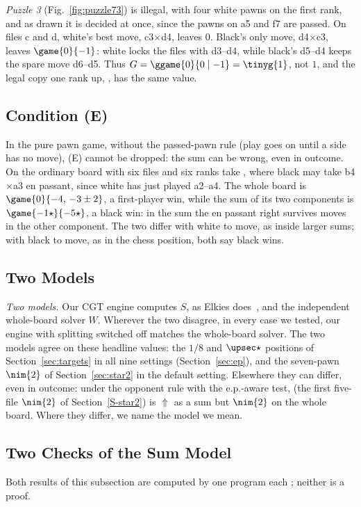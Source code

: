 \emph{Puzzle 3} (Fig.~\ref{fig:puzzle73}) is illegal, with four white pawns on the first rank, and as drawn it
is decided at once, since the pawns on a5 and f7 are passed. On files c and d, white's best move, c3$\times$d4,
leaves $0$. Black's only move, d4$\times$c3, leaves $\game{0}{-1}$: white locks the files with d3--d4, while
black's d5--d4 keeps the spare move d6--d5. Thus $G=\ggame{0}{0\mid -1}=\tinyg{1}$, not $1$, and the legal copy
one rank up, , has the same value.

\subsection{Condition (E)}
\begin{proposition}[\lab{C1}]\label{prop:condE}
In the pure pawn game, without the passed-pawn rule (play goes on until a side has no move), (E) cannot
be dropped: the sum can be wrong, even in outcome. On the ordinary board with six files and six ranks take
, where black may take b4$\times$a3 en passant, since white has just played a2--a4. The
whole board is $\game{0}{-4,\,-3\pm2}$, a first-player win, while the sum of its two components is
$\game{-1\star}{-5\star}$, a black win: in the sum the en passant right survives moves in the other component. The two differ
with white to move, as inside larger sums; with black to move, as in the chess position,
both say black wins.
\end{proposition}

\subsection{Two Models}
\emph{Two models.} Our CGT engine computes $S$, as Elkies does~\cite{Elkies1996}, and the independent
whole-board solver $W$. Wherever the two disagree, in every case we tested,
our engine with splitting switched off matches the whole-board solver. The two models agree on these headline values: the $1/8$ and $\upsec\star$
positions of Section~\ref{sec:targets} in all nine settings (Section~\ref{sec:ep}), and the seven-pawn $\nim{2}$
of Section~\ref{sec:star2} in the default setting. Elsewhere they can differ, even in outcome: under the
opponent rule with the e.p.-aware test,  (the first five-file $\nim{2}$ of
Section~\ref{S-star2}) is ${\Uparrow}$ as a sum but $\nim{2}$ on the whole board. Where they differ, we name the model we mean.

\subsection{Two Checks of the Sum Model}\label{S-sumchecks}
Both results of this subsection are computed by one program each ; neither is a proof.

